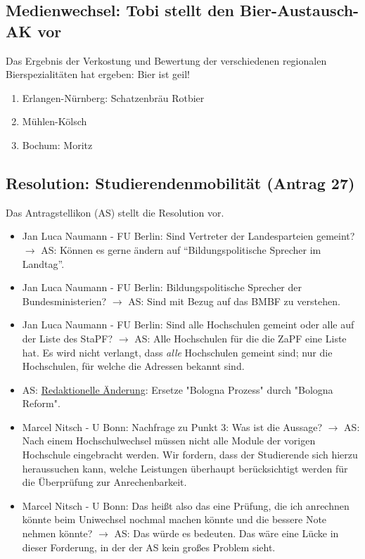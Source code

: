   \subsection{Medienwechsel: Tobi stellt den Bier-Austausch-AK vor}
    Das Ergebnis der Verkostung und Bewertung der verschiedenen regionalen Bierspezialitäten hat ergeben: Bier ist geil!
    \begin{enumerate}
      \item Erlangen-Nürnberg: Schatzenbräu Rotbier
      \item Mühlen-Kölsch
      \item Bochum: Moritz
    \end{enumerate}

  \subsection{Resolution: Studierendenmobilität (Antrag 27)}
    Das Antragstellikon (AS) stellt die Resolution vor.
    \begin{itemize}
      \item Jan Luca Naumann - FU Berlin:  Sind Vertreter der Landesparteien gemeint?
        $\rightarrow$ AS: Können es gerne ändern auf ``Bildungspolitische Sprecher im Landtag''.
      \item Jan Luca Naumann - FU Berlin:  Bildungspolitische Sprecher der Bundesministerien?
        $\rightarrow$ AS: Sind mit Bezug auf das BMBF zu verstehen.
      \item Jan Luca Naumann - FU Berlin:  Sind alle Hochschulen gemeint oder alle auf der Liste des StaPF?
        $\rightarrow$ AS: Alle Hochschulen für die die ZaPF eine Liste hat. Es wird nicht verlangt, dass \textit{alle} Hochschulen gemeint sind; nur die Hochschulen, für welche die Adressen bekannt sind.
      \item AS: \underline{Redaktionelle Änderung}: Ersetze "Bologna Prozess" durch "Bologna Reform".
      \item Marcel Nitsch - U Bonn:  Nachfrage zu Punkt 3: Was ist die Aussage?
        $\rightarrow$ AS: Nach einem Hochschulwechsel müssen nicht alle Module der vorigen Hochschule eingebracht werden. Wir fordern, dass der Studierende sich hierzu heraussuchen kann, welche Leistungen überhaupt berücksichtigt werden für die Überprüfung zur Anrechenbarkeit.
      \item Marcel Nitsch - U Bonn:  Das heißt also das eine Prüfung, die ich anrechnen könnte beim Uniwechsel nochmal machen könnte und die bessere Note nehmen könnte?
        $\rightarrow$ AS: Das würde es bedeuten. Das wäre eine Lücke in dieser Forderung, in der der AS kein großes Problem sieht.
    \end{itemize}

